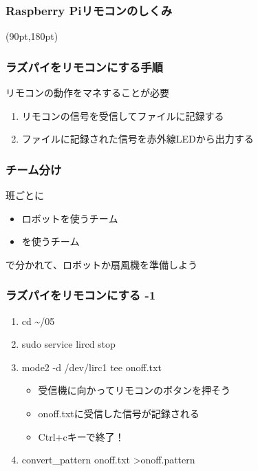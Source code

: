 \begin{frame}
    \frametitle{Raspberry Piリモコンのしくみ}
    \vspace{12pt}
    \begin{center}
        
    \end{center}
    \begin{textblock*}{0.4\linewidth}(90pt,180pt)
    \end{textblock*}
\end{frame}

\begin{frame}
    \frametitle{ラズパイをリモコンにする手順} 
    リモコンの動作をマネすることが必要
    \begin{enumerate}
        \item リモコンの信号を受信してファイルに記録する
        \item ファイルに記録された信号を赤外線LEDから出力する
    \end{enumerate}
\end{frame}

\begin{frame}
    \frametitle{チーム分け}
    班ごとに
    \begin{itemize}
        \item ロボットを使うチーム
        \item {}を使うチーム
    \end{itemize}
    で分かれて、ロボットか扇風機を準備しよう
\end{frame}

\begin{frame}
    \frametitle{ラズパイをリモコンにする -1} 
    \begin{enumerate}
        \item cd \textasciitilde/05
        \item sudo service lircd stop
        \item mode2 -d /dev/lirc1 \textbar tee onoff.txt
        \begin{itemize}
            \item 受信機に向かってリモコンのボタンを押そう
            \item onoff.txtに受信した信号が記録される
            \item Ctrl+cキーで終了！
        \end{itemize}
        \item convert\_pattern onoff.txt \textgreater \space onoff.pattern
    \end{enumerate}
\end{frame}

